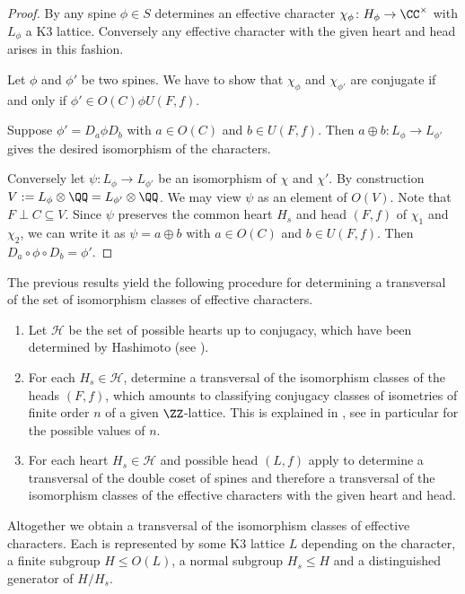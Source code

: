 \begin{proof}
By  any spine $\phi \in S$ determines an effective character $\chi_\phi\colon H_\phi \to \CC^\times$ with $L_\phi$ a K3 lattice.
Conversely any effective character with the given heart and head arises in this fashion.

Let $\phi$ and $\phi'$ be two spines. We have to show that $\chi_\phi$ and $\chi_{\phi'}$ are conjugate if and only if $\phi' \in O(C) \phi U(F,f)$.

Suppose $\phi' = D_a \phi D_b$ with $a \in O(C)$ and $b \in U(F,f)$. Then $a \oplus b\colon L_\phi \to L_{\phi'}$ gives the desired isomorphism of the characters.

Conversely let $\psi\colon L_\phi \to L_{\phi'}$ be an isomorphism of $\chi$ and $\chi'$.
By construction $V:=L_\phi \otimes \QQ=L_{\phi'}\otimes \QQ$. We may view $\psi$ as an element of $O(V)$. Note that $F \perp C \subseteq V$. Since $\psi$ preserves the common heart $H_s$ and head $(F,f)$ of $\chi_1$ and $\chi_2$, we can write it as $\psi = a \oplus b$ with $a \in O(C)$ and $b \in U(F,f)$. Then $ D_a \circ \phi \circ D_b = \phi'$.
\end{proof}


\begin{remark}
The previous results yield the following procedure for determining a transversal of the set of isomorphism classes of effective characters.
  \begin{enumerate}
    \item
      Let $\mathcal{H}$ be the set of possible hearts up to conjugacy, which have been determined by Hashimoto \cite{Hashimoto2012} (see ).
    \item
      For each $H_s \in \mathcal{H}$, determine a transversal of the isomorphism classes of the heads $(F, f)$, which amounts to classifying conjugacy classes of isometries of finite order $n$ of a given $\ZZ$-lattice.
      This is explained in , see in particular  for the possible values of $n$.
    \item
      For each heart $H_s \in \mathcal{H}$ and possible head $(L, f)$ apply  to determine
      a transversal of the double coset of spines and therefore a transversal of the isomorphism classes of the effective characters with the given heart and head.
  \end{enumerate}
  Altogether we obtain a transversal of the isomorphism classes of effective characters.
Each is represented by some K3 lattice $L$ depending on the character, a finite subgroup $H \leq O(L)$, a normal subgroup $H_s \leq H$ and a distinguished generator of $H/H_s$.
\end{remark}

